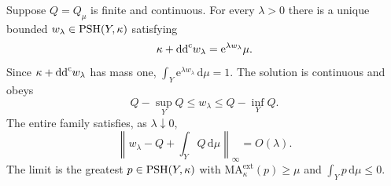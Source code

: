 \begin{theorem}\label{thm:continuous-potential-curve-exponential}
Suppose $Q=Q_\mu$ is finite and continuous. For every $\lambda>0$ there is a unique bounded $w_\lambda\in\mathrm{PSH}(Y,\kappa)$ satisfying
\begin{equation}\label{eq:continuous-potential-curve-exponential}
 \kappa+\mathrm{dd}^{\mathrm{c}} w_\lambda=\mathrm e^{\lambda w_\lambda}\mu.
\end{equation}
Since $\kappa+\mathrm{dd}^{\mathrm{c}} w_\lambda$ has mass one, $\int_Y\mathrm e^{\lambda w_\lambda}\,\mathrm d\mu=1$. The solution is continuous and obeys
\begin{equation}\label{eq:continuous-potential-curve-barriers}
 Q-\sup_YQ\leq w_\lambda\leq Q-\inf_YQ.
\end{equation}
The entire family satisfies, as $\lambda\downarrow0$,
\[
 \left\|w_\lambda-Q+\int_YQ\,\mathrm d\mu\right\|_\infty=O(\lambda).
\]
The limit is the greatest $p\in\mathrm{PSH}(Y,\kappa)$ with $\mathrm{MA}^{\mathrm{ext}}_\kappa(p)\geq\mu$ and $\int_Yp\,\mathrm d\mu\leq0$.
\end{theorem}
